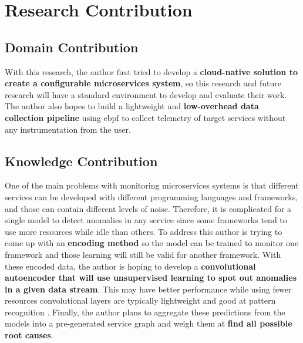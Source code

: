 \section{Research Contribution}


\subsection{Domain Contribution}

With this research, the author first tried to develop a \textbf{cloud-native solution to create a configurable microservices system}, so this research and future research will have a standard environment to develop and evaluate their work. The author also hopes to build a lightweight and \textbf{low-overhead data collection pipeline} using \ac{ebpf} to collect telemetry of target services without any instrumentation from the user.

\subsection{Knowledge Contribution}

One of the main problems with monitoring microservices systems is that different services can be developed with different programming languages and frameworks, and those can contain different levels of noise\label{need-for-encoding}. Therefore, it is complicated for a single model to detect anomalies in any service since some frameworks tend to use more resources while idle than others. To address this author is trying to come up with an \textbf{encoding method} so the model can be trained to monitor one framework and those learning will still be valid for another framework. With these encoded data, the author is hoping to develop a \textbf{convolutional autoencoder that will use unsupervised learning to spot out anomalies in a given data stream}. This may have better performance while using fewer resources convolutional layers are typically lightweight and good at pattern recognition \citep{oord2016wavenet}. Finally, the author plans to aggregate these predictions from the models into a pre-generated service graph and weigh them at \textbf{find all possible root causes}.
